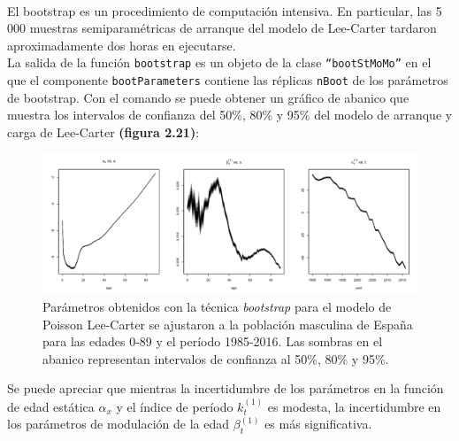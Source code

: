 {
\setlength{\fboxsep}{0.75pt}%
\noindent\setlength{\fboxrule}{0pt}%
}\\

El bootstrap es un procedimiento de computación intensiva. En particular, las 5 000 muestras semiparamétricas de arranque del modelo de Lee-Carter tardaron aproximadamente dos horas en ejecutarse.\\

La salida de la función  \texttt{bootstrap} es un objeto de la clase \texttt{``bootStMoMo''} en el que el componente \texttt{bootParameters} contiene las réplicas \texttt{nBoot} de los parámetros de bootstrap. Con el comando se puede obtener un gráfico de abanico que muestra los intervalos de confianza del 50\%, 80\% y 95\% del modelo de arranque y carga de Lee-Carter \textbf{(figura 2.21)}:

\vspace{-0.3cm}
\begin{figure}[!htp]
\centering
\hspace*{-0.5cm}
\includegraphics[scale=0.43]{Cap2/stmomo01.png}
\captionsetup{width=1\linewidth}
\caption[Parámetros obtenidos con la técnica \textit{bootstrap} para el modelo de Poisson Lee-Carter]{Parámetros obtenidos con la técnica \textit{bootstrap} para el modelo de Poisson Lee-Carter se ajustaron a la población masculina de España para las edades 0-89 y el período 1985-2016. Las sombras en el abanico representan intervalos de confianza al 50\%, 80\% y 95\%.}
\end{figure}

Se puede apreciar que mientras la incertidumbre de los parámetros en la función de edad estática $\alpha_{x}$ y el índice de período $k_{t}^{(1)}$ es modesta, la incertidumbre en los parámetros de modulación de la edad $\beta_{t}^{(1)}$ es más significativa.\\

